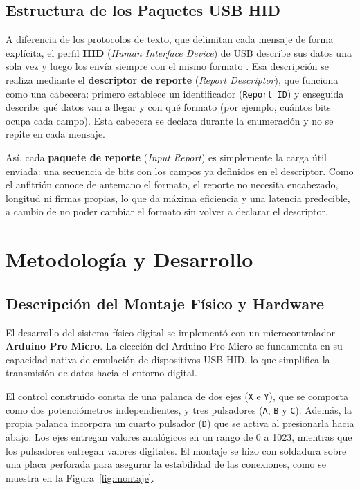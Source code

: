 \documentclass[journal]{IEEEtran}
\begin{document}
\subsection{Estructura de los Paquetes USB HID}
A diferencia de los protocolos de texto, que delimitan cada mensaje de forma explícita, el perfil \textbf{HID} (\textit{Human Interface Device}) de USB describe sus datos una sola vez y luego los envía siempre con el mismo formato \cite{usbhid}. Esa descripción se realiza mediante el \textbf{descriptor de reporte} (\textit{Report Descriptor}), que funciona como una cabecera: primero establece un identificador (\texttt{Report ID}) y enseguida describe qué datos van a llegar y con qué formato (por ejemplo, cuántos bits ocupa cada campo). Esta cabecera se declara durante la enumeración y no se repite en cada mensaje.

Así, cada \textbf{paquete de reporte} (\textit{Input Report}) es simplemente la carga útil enviada: una secuencia de bits con los campos ya definidos en el descriptor. Como el anfitrión conoce de antemano el formato, el reporte no necesita encabezado, longitud ni firmas propias, lo que da máxima eficiencia y una latencia predecible, a cambio de no poder cambiar el formato sin volver a declarar el descriptor.

\section{Metodología y Desarrollo}

\subsection{Descripción del Montaje Físico y Hardware}
El desarrollo del sistema físico-digital se implementó con un microcontrolador \textbf{Arduino Pro Micro}. La elección del Arduino Pro Micro se fundamenta en su capacidad nativa de emulación de dispositivos USB HID, lo que simplifica la transmisión de datos hacia el entorno digital.


El control construido consta de una palanca de dos ejes (\texttt{X} e \texttt{Y}), que se comporta como dos potenciómetros independientes, y tres pulsadores (\texttt{A}, \texttt{B} y \texttt{C}). Además, la propia palanca incorpora un cuarto pulsador (\texttt{D}) que se activa al presionarla hacia abajo. Los ejes entregan valores analógicos en un rango de 0 a 1023, mientras que los pulsadores entregan valores digitales. El montaje se hizo con soldadura sobre una placa perforada para asegurar la estabilidad de las conexiones, como se muestra en la Figura~\ref{fig:montaje}.
\end{document}
